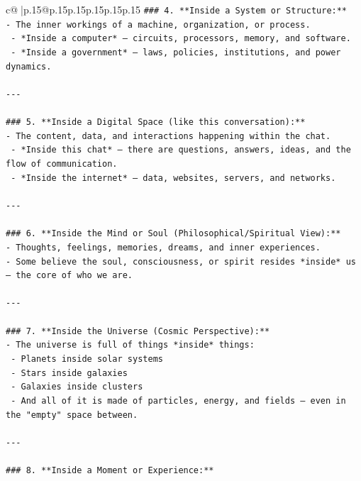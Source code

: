 \documentclass{article}
\begin{document}
{\begin{supertabular}{c@{$\;$}|p{.15\linewidth}@{}p{.15\linewidth}p{.15\linewidth}p{.15\linewidth}p{.15\linewidth}p{.15\linewidth}}
{{{\texttt{\#\#\# 4. **Inside a System or Structure:**  } \\
\texttt{{-} The inner workings of a machine, organization, or process.  } \\
\texttt{  {-} *Inside a computer* — circuits, processors, memory, and software.  } \\
\texttt{  {-} *Inside a government* — laws, policies, institutions, and power dynamics.} \\
\\ 
\texttt{{-}{-}{-}} \\
\\ 
\texttt{\#\#\# 5. **Inside a Digital Space (like this conversation):**  } \\
\texttt{{-} The content, data, and interactions happening within the chat.  } \\
\texttt{  {-} *Inside this chat* — there are questions, answers, ideas, and the flow of communication.  } \\
\texttt{  {-} *Inside the internet* — data, websites, servers, and networks.} \\
\\ 
\texttt{{-}{-}{-}} \\
\\ 
\texttt{\#\#\# 6. **Inside the Mind or Soul (Philosophical/Spiritual View):**  } \\
\texttt{{-} Thoughts, feelings, memories, dreams, and inner experiences.  } \\
\texttt{{-} Some believe the soul, consciousness, or spirit resides *inside* us — the core of who we are.} \\
\\ 
\texttt{{-}{-}{-}} \\
\\ 
\texttt{\#\#\# 7. **Inside the Universe (Cosmic Perspective):**  } \\
\texttt{{-} The universe is full of things *inside* things:  } \\
\texttt{  {-} Planets inside solar systems  } \\
\texttt{  {-} Stars inside galaxies  } \\
\texttt{  {-} Galaxies inside clusters  } \\
\texttt{  {-} And all of it is made of particles, energy, and fields — even in the "empty" space between.} \\
\\ 
\texttt{{-}{-}{-}} \\
\\ 
\texttt{\#\#\# 8. **Inside a Moment or Experience:**  } \\
}}}
\end{supertabular}}
\end{document}
